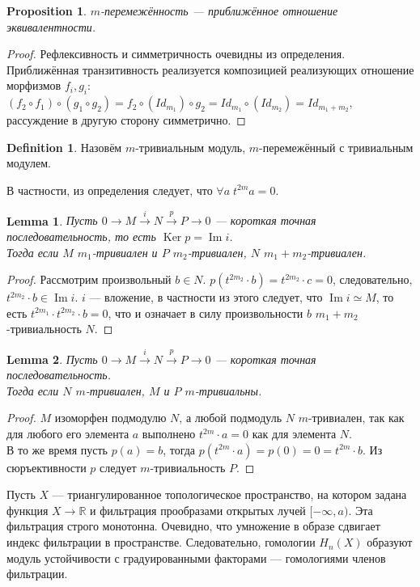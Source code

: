 \documentclass[a4paper, 12pt]{article}
\newtheorem{proposition}{Proposition}
\newtheorem{lemma}{Lemma}
\theoremstyle{definition}
\newtheorem{definition}{Definition}
\theoremstyle{remark}
\begin{document}
\begin{proposition}
  $m$-перемежённость --- приближённое отношение эквивалентности.
\end{proposition}
\begin{proof}
  Рефлексивность и симметричность очевидны из определения.\\
  Приближённая транзитивность реализуется композицией реализующих отношение морфизмов $f_i, g_i$:\\
  $(f_2 \circ f_1) \circ (g_1 \circ g_2) = f_2 \circ (Id_{m_1}) \circ g_2 = Id_{m_1} \circ (Id_{m_2}) = Id_{m_1 + m_2}$, рассуждение в другую сторону симметрично.
\end{proof}
\begin{definition}
  Назовём $m$-тривиальным модуль, $m$-перемежённый с тривиальным модулем.
\end{definition}
В частности, из определения следует, что $\forall a\; t^{2m}a = 0$.
\begin{lemma}
  Пусть $0 \to M \xrightarrow{i} N \xrightarrow{p} P \to 0$ --- короткая точная последовательность, то есть $\operatorname{Ker}p = \operatorname{Im}i$.\\
  Тогда если $M$ $m_1$-тривиален и $P$ $m_2$-тривиален, $N$ $m_1 + m_2$-тривиален.
\end{lemma}
\begin{proof}
  Рассмотрим произвольный $b \in N$. $p(t^{2m_2} \cdot b) = t^{2m_2} \cdot c = 0$, следовательно, $t^{2m_2} \cdot b \in \operatorname{Im}i$. $i$ --- вложение, в частности из этого следует, что $\operatorname{Im}i \simeq M$, то есть $t^{2m_1} \cdot t^{2m_2} \cdot b = 0$, что и означает в силу произвольности $b$ $m_1+m_2$-тривиальность $N$.
\end{proof}
\begin{lemma}
  Пусть $0 \to M \xrightarrow{i} N \xrightarrow{p} P \to 0$ --- короткая точная последовательность.\\
  Тогда если $N$ $m$-тривиален, $M$ и $P$ $m$-тривиальны.
\end{lemma}
\begin{proof}
  $M$ изоморфен подмодулю $N$, а любой подмодуль $N$ $m$-тривиален, так как для любого его элемента $a$ выполнено $t^{2m} \cdot a = 0$ как для элемента $N$.\\
  В то же время пусть $p(a) = b$, тогда $p(t^{2m} \cdot a) = p(0) = 0 = t^{2m} \cdot b$. Из сюръективности $p$ следует $m$-тривиальность $P$.
\end{proof}
Пусть $X$ --- триангулированное топологическое пространство, на котором задана функция $X \to \mathbb{R}$ и фильтрация прообразами открытых лучей $[-\infty,a)$. Эта фильтрация строго монотонна. Очевидно, что умножение в образе сдвигает индекс фильтрации в пространстве. Следовательно, гомологии $H_n(X)$ образуют модуль устойчивости с градуированными факторами --- гомологиями членов фильтрации.
\end{document}
